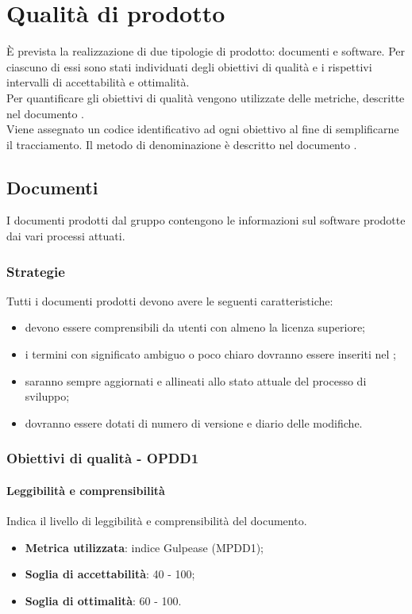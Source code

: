 \documentclass[PianoDiQualifica.tex]{subfiles}
\begin{document}
\section{Qualità di prodotto}
	È prevista la realizzazione di due tipologie di prodotto: documenti e software. Per ciascuno di essi sono stati individuati
	degli obiettivi di qualità e i rispettivi intervalli di accettabilità e ottimalità. \\
	Per quantificare gli obiettivi di qualità vengono utilizzate delle metriche, descritte nel documento \NPdocRP{}. \\
	Viene assegnato un codice identificativo ad ogni obiettivo al fine di semplificarne il tracciamento. Il metodo di denominazione
	è descritto nel documento \NPdocRP{}.
	
	\subsection{Documenti}
		I documenti prodotti dal gruppo \GRUPPO{} contengono le informazioni sul software prodotte dai vari processi attuati.
	
		\subsubsection{Strategie}
		Tutti i documenti prodotti devono avere le seguenti caratteristiche:
		\begin{itemize}
			\item devono essere comprensibili da utenti con almeno la licenza superiore;
			\item i termini con significato ambiguo o poco chiaro dovranno essere inseriti nel \GldocRP{};
			\item saranno sempre aggiornati e allineati allo stato attuale del processo di sviluppo;
			\item dovranno essere dotati di numero di versione e diario delle modifiche.
		\end{itemize}
		
		\subsubsection{Obiettivi di qualità - OPDD1}
			\paragraph{Leggibilità e comprensibilità}
			Indica il livello di leggibilità e comprensibilità del documento.
			\begin{itemize}
				\item \textbf{Metrica utilizzata}: indice Gulpease (MPDD1);
				\item \textbf{Soglia di accettabilità}: 40 - 100;
				\item \textbf{Soglia di ottimalità}: 60 - 100.
			\end{itemize}
					
\end{document}
